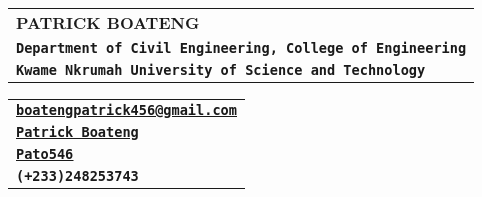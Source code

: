 \documentclass[12pt]{article}
\begin{document}
	
\noindent	
\begin{tcolorbox}[colback=lightGray!10,colframe=black,arc=0pt,outer arc=0pt,boxsep=0pt,left=4pt,right=0pt,top=1pt,bottom=2pt,boxrule=0pt]
	\begin{minipage}[c]{0.65\textwidth}
		\begin{table}[H]
			\def\arraystretch{1.5}
			\begin{tabular}{l}
			{\Huge\textsf{\textbf{PATRICK BOATENG}}} \\
			\texttt{\textbf{Department of Civil Engineering, College of Engineering}} \\
			\texttt{\textbf{Kwame Nkrumah University of Science and Technology}}
			\end{tabular}
		\end{table}	
	\end{minipage}
	\vrule width 2pt height 1.5cm
	\begin{minipage}[c]{0.35\textwidth}
		\begin{table}[H]
		\def\arraystretch{1.4}
			\begin{tabular}{l}
			\faEnvelope \space \href{mailto:boatengpatrick456@gmail.com}{\texttt{\textbf{\underline{boatengpatrick456@gmail.com}}}} \\
			\faLinkedin \space \href{https://www.linkedin.com/in/patrick-boateng-7a9a6b150}{\texttt{\textbf{\underline{Patrick Boateng}}}} \\
			\faGithub \space \href{https://www.github.com/Pato546}{\texttt{\textbf{\underline{Pato546}}}} \\
			\faPhone \space \texttt{\textbf{(+233)248253743}}
			\end{tabular}
		\end{table}
	\end{minipage}
\end{tcolorbox}

\smallskip
\end{document}
